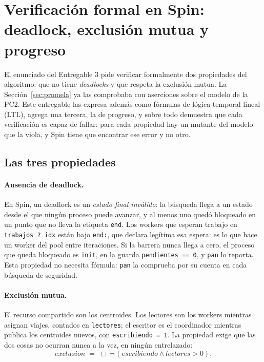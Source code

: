 \section{Verificación formal en Spin: deadlock, exclusión mutua y progreso}\label{sec:verificacion}

El enunciado del Entregable 3 pide verificar formalmente dos propiedades del algoritmo: que no tiene
\emph{deadlocks} y que respeta la exclusión mutua. La Sección~\ref{sec:promela} ya las comprobaba con
aserciones sobre el modelo de la PC2. Este entregable las expresa además como fórmulas de lógica
temporal lineal (LTL), agrega una tercera, la de progreso, y sobre todo demuestra que cada
verificación es capaz de fallar: para cada propiedad hay un mutante del modelo que la viola, y Spin
tiene que encontrar ese error y no otro.

\subsection{Las tres propiedades}

\paragraph{Ausencia de deadlock.} En Spin, un deadlock es un \emph{estado final inválido}: la
búsqueda llega a un estado desde el que ningún proceso puede avanzar, y al menos uno quedó bloqueado
en un punto que no lleva la etiqueta \texttt{end}. Los workers que esperan trabajo en
\texttt{trabajos ? idx} están bajo \texttt{end:}, que declara legítima esa espera: es lo que hace
un worker del pool entre iteraciones. Si la barrera nunca llega a cero, el proceso que queda
bloqueado es \texttt{init}, en la guarda \texttt{pendientes == 0}, y \texttt{pan} lo reporta.
Esta propiedad no necesita fórmula: \texttt{pan} la comprueba por su cuenta en cada búsqueda de
seguridad.

\paragraph{Exclusión mutua.} El recurso compartido son los centroides. Los lectores son los workers
mientras asignan viajes, contados en \texttt{lectores}; el escritor es el coordinador mientras
publica los centroides nuevos, con \texttt{escribiendo = 1}. La propiedad exige que las dos cosas no
ocurran nunca a la vez, en ningún entrelazado:
\[
  \textit{exclusion} \;=\; \Box\, \neg\,(\textit{escribiendo} \wedge \textit{lectores} > 0).
\]

